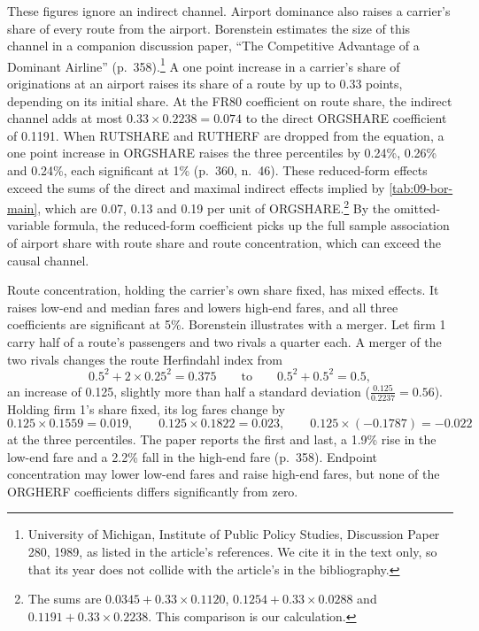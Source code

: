 These figures ignore an indirect channel. Airport dominance also raises a carrier's share of every route from
the airport. Borenstein estimates the size of this channel in a companion discussion paper, ``The Competitive
Advantage of a Dominant Airline'' (p.~358).\footnote{University of Michigan, Institute of Public Policy Studies,
Discussion Paper 280, 1989, as listed in the article's references. We cite it in the text only, so that its year
does not collide with the article's in the bibliography.} A one point increase in a carrier's share of originations at an airport raises its share of a route by up to 0.33
points, depending on its initial share. At the FR80 coefficient on route share, the indirect channel adds at most
$0.33 \times 0.2238 = 0.074$ to the direct ORGSHARE coefficient of 0.1191. When RUTSHARE and RUTHERF are dropped
from the equation, a one point increase in ORGSHARE raises the three percentiles by 0.24\%, 0.26\% and 0.24\%,
each significant at 1\% (p.~360, n.~46). These reduced-form effects exceed the sums of the direct and maximal
indirect effects implied by \cref{tab:09-bor-main}, which are 0.07, 0.13 and 0.19 per unit of
ORGSHARE.\footnote{The sums are $0.0345 + 0.33 \times 0.1120$, $0.1254 + 0.33 \times 0.0288$ and
$0.1191 + 0.33 \times 0.2238$. This comparison is our calculation.} By the omitted-variable formula, the
reduced-form coefficient picks up the full sample association of airport share with route share and route
concentration, which can exceed the causal channel.

Route concentration, holding the carrier's own share fixed, has mixed effects. It raises low-end and median fares
and lowers high-end fares, and all three coefficients are significant at 5\%. Borenstein illustrates with a
merger. Let firm 1 carry half of a route's passengers and two rivals a quarter each. A merger of the two rivals
changes the route Herfindahl index from
\begin{equation*}
0.5^2 + 2 \times 0.25^2 = 0.375 \qquad \text{to} \qquad 0.5^2 + 0.5^2 = 0.5,
\end{equation*}
an increase of 0.125, slightly more than half a standard deviation ($\frac{0.125}{0.2237} = 0.56$). Holding
firm 1's share fixed, its log fares change by
\begin{equation*}
0.125 \times 0.1559 = 0.019, \qquad 0.125 \times 0.1822 = 0.023, \qquad 0.125 \times (-0.1787) = -0.022
\end{equation*}
at the three percentiles. The paper reports the first and last, a 1.9\% rise in the low-end fare and a 2.2\%
fall in the high-end fare (p.~358). Endpoint concentration may lower low-end fares and raise high-end fares,
but none of the ORGHERF coefficients differs significantly from zero.

